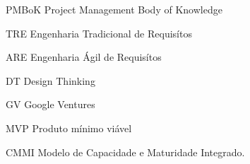 \begin{siglas}
\item[PMBoK] Project Management Body of Knowledge 
\item[TRE] Engenharia Tradicional de Requisítos
\item[ARE] Engenharia Ágil de Requisítos
\item[DT] Design Thinking
\item [GV] Google Ventures
\item [MVP] Produto mínimo viável
\item [CMMI] Modelo de Capacidade e Maturidade Integrado.
\end{siglas}